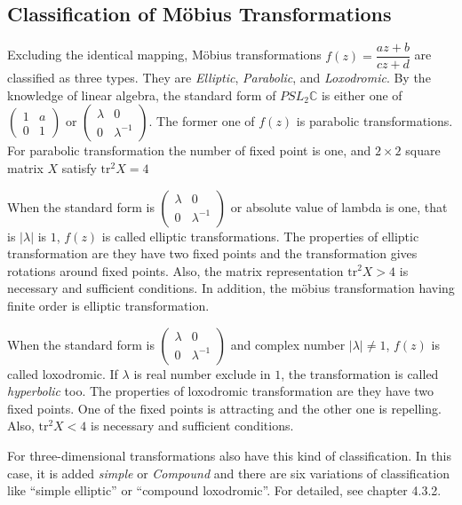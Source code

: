 \subsection{Classification of M\"obius Transformations}

Excluding the identical mapping, M\"obius transformations
$f(z) = \dfrac{az + b}{cz + d}$ are classified as three types.
They are \textit{Elliptic}, \textit{Parabolic}, and \textit{Loxodromic}.
By the knowledge of linear algebra, the standard form of $PSL_2\mathbb{C}$
is either one of $\begin{pmatrix}1 & a \\ 0 & 1 \end{pmatrix}$ or
$\begin{pmatrix}\lambda & 0 \\ 0 & \lambda^{-1} \end{pmatrix}$.
The former one of $f(z)$ is parabolic transformations.
For parabolic transformation the number of fixed point is one, and
$2 \times 2$ square matrix $X$ satisfy $\mathrm{tr}^2X = 4$

When the standard form is
$\begin{pmatrix}\lambda & 0 \\ 0 & \lambda^{-1} \end{pmatrix}$
or absolute value of lambda is one, that is  $|\lambda|$ is $1$, 
$f(z)$ is called elliptic transformations.
The properties of elliptic transformation are they have
two fixed points and the transformation gives rotations around fixed
points.
Also, the matrix representation $\mathrm{tr}^2X > 4$ is 
necessary and sufficient conditions.
In addition, the m\"obius transformation having finite order
is elliptic transformation.

When the standard form is
$\begin{pmatrix}\lambda & 0 \\ 0 & \lambda^{-1} \end{pmatrix}$
and complex number $|\lambda| \neq 1$, $f(z)$ is called loxodromic.
If $\lambda$ is real number exclude in $1$, the transformation is called
\textit{hyperbolic} too.
The properties of loxodromic transformation are they have two fixed
points. One of the fixed points is attracting and the other one is repelling.
Also, $\mathrm{tr}^2X < 4$ is necessary and sufficient conditions.

For three-dimensional transformations also have this kind of
classification.
In this case, it is added \textit{simple} or \textit{Compound} and
there are six variations of classification like ``simple elliptic'' or
``compound loxodromic''.
For detailed, see chapter 4.3.2.

